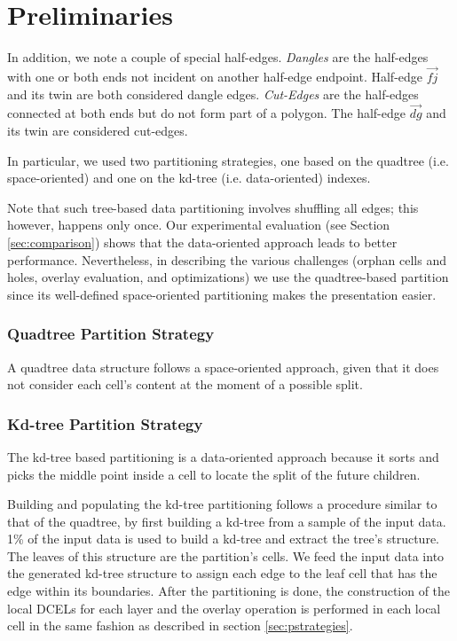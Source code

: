 \section{Preliminaries} %

In addition, we note a couple of special half-edges. \textit{Dangles} are the half-edges with one or both ends not incident on another half-edge endpoint. Half-edge \textit{$\overrightarrow{fj}$} and its twin are both considered dangle edges.  \textit{Cut-Edges} are the half-edges connected at both ends but do not form part of a polygon. The half-edge \textit{$\overrightarrow{dg}$} and its twin are considered cut-edges.

In particular, we used two partitioning strategies, one based on the quadtree (i.e. space-oriented) and one on the kd-tree (i.e. data-oriented) indexes.

Note that such tree-based data partitioning involves shuffling all edges; this however, happens only once. Our experimental evaluation (see Section \ref{sec:comparison}) shows that the data-oriented approach leads to better performance. Nevertheless, in describing the various challenges (orphan cells and holes, overlay evaluation, and optimizations) we use the quadtree-based partition since its well-defined space-oriented partitioning makes the presentation easier.

\subsubsection{Quadtree Partition Strategy} %

A quadtree data structure follows a space-oriented approach, given that it does not  consider each cell's content at the moment of a possible split.

\subsubsection{Kd-tree Partition Strategy} \label{sec:kdtreestrategy}
The kd-tree based partitioning is a data-oriented approach because it sorts and picks the middle point inside a cell to locate the split of the future children.

Building and populating the kd-tree partitioning follows a procedure similar to that of the quadtree, by first building a kd-tree from a sample of the input data.  1\% of the input data is used to build a kd-tree and extract the tree's structure.  The leaves of this structure are the partition's cells.  We feed the input data into the generated kd-tree structure to assign each edge to the leaf cell that has the edge within its boundaries.  After the partitioning is done, the construction of the local DCELs for each layer and the overlay operation is performed in each local cell in the same fashion as described in section \ref{sec:pstrategies}.
